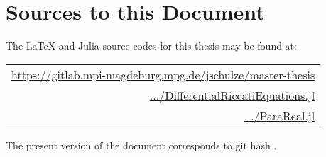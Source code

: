 \section*{Sources to this Document}

The \LaTeX{} and Julia source codes for this thesis may be found at:
\begin{center}
\begin{tabular}{r}
  \url{https://gitlab.mpi-magdeburg.mpg.de/jschulze/master-thesis} \\
  \href{https://gitlab.mpi-magdeburg.mpg.de/jschulze/DifferentialRiccatiEquations.jl}{\ttfamily .../DifferentialRiccatiEquations.jl} \\
  \href{https://gitlab.mpi-magdeburg.mpg.de/jschulze/ParaReal.jl}{\ttfamily .../ParaReal.jl}
\end{tabular}
\end{center}
The present version of the document corresponds to git hash
\code{}\unskip.
